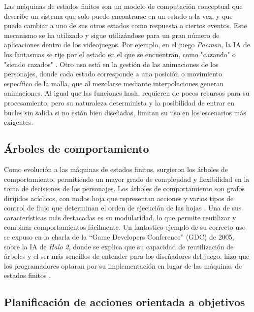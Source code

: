 Las máquinas de estados finitos son un modelo de computación conceptual que describe un sistema que solo puede encontrarse en un estado a la vez, y que puede cambiar a uno de sus otros estados como respuesta a ciertos eventos. Este mecanismo se ha utilizado y sigue utilizándose para un gran número de aplicaciones dentro de los videojuegos. Por ejemplo, en el juego \textit{Pac\-man}, la IA de los fantasmas se rije por el estado en el que se encuentran, como "cazando" o "siendo cazados" \cite{mike_game_2016}. Otro uso está en la gestión de las animaciones de los personajes, donde cada estado corresponde a una posición o movimiento específico de la malla, que al mezclarse mediante interpolaciones generan animaciones. Al igual que las funciones hash, requieren de pocos recursos para su procesamiento, pero su naturaleza determinista y la posibilidad de entrar en bucles sin salida si no están bien diseñadas, limitan su uso en los escenarios más exigentes.

\subsection{Árboles de comportamiento}

Como evolución a las máquinas de estados finitos, surgieron los árboles de comportamiento, permitiendo un mayor grado de complejidad y flexibilidad en la toma de decisiones de los personajes. Los árboles de comportamiento son grafos dirijidos acíclicos, con nodos hoja que representan acciones y varios tipos de control de flujo que determinan el orden de ejecución de las hojas \cite{epic_games_behavior_2025}. Una de sus características más destacadas es su modularidad, lo que permite reutilizar y combinar comportamientos fácilmente. Un fantastico ejemplo de su correcto uso se expuso en la charla de la ``Game Developers Conference'' (GDC) de 2005, sobre la IA de \textit{Halo 2}, donde se explica que su capacidad de reutilización de árboles y el ser más sencillos de entender para los diseñadores del juego, hizo que los programadores optaran por su implementación en lugar de las máquinas de estados finitos \cite{isla_managing_2005}.


\subsection{Planificación de acciones orientada a objetivos}

